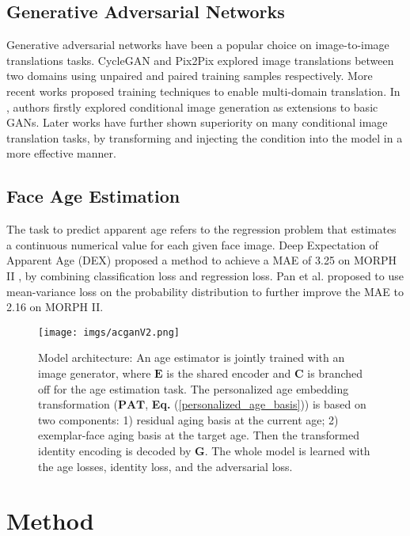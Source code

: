 \documentclass[final]{cvpr}
\begin{document}
\subsection{Generative Adversarial Networks}
Generative adversarial networks \cite{goodfellow2014generative} have been a popular choice on image-to-image translations tasks. CycleGAN \cite{zhu2017unpaired} and Pix2Pix \cite{pix2pix2017} explored image translations between two domains using unpaired and paired training samples respectively. More recent works \cite{choi2018stargan,liu2019stgan} proposed training techniques to enable multi-domain translation. In \cite{mirza2014conditional, odena2017conditional}, authors firstly explored conditional image generation as extensions to basic GANs. Later works \cite{choi2020stargan,park2019gaugan} have further shown superiority on many conditional image translation tasks, by transforming and injecting the condition into the model in a more effective manner.

\subsection{Face Age Estimation}
The task to predict apparent age refers to the regression problem that estimates a continuous numerical value for each given face image. Deep Expectation of Apparent Age (DEX) \cite{rothe2015dex} proposed a method to achieve a MAE of 3.25 on MORPH II \cite{ricanek2006morph}, by combining classification loss and regression loss. Pan et al. \cite{pan2018mean} proposed to use mean-variance loss on the probability distribution to further improve the MAE to 2.16 on MORPH II.


\begin{figure}
\centering
\texttt{[image: imgs/acganV2.png]}
\caption{Model architecture: An age estimator is jointly trained with an image generator, where \(\mathbf{E}\) is the shared encoder and \(\mathbf{C}\) is branched off for the age estimation task. The personalized age embedding transformation ($\mathbf{PAT}$, \textbf{Eq.} (\ref{personalized_age_basis})) is based on two components: 
1) residual aging basis at the current age; 
2) exemplar-face aging basis at the target age. Then the transformed identity encoding is decoded by $\mathbf{G}$. The whole model is learned with the age losses, identity loss, and the adversarial loss.}
\label{method_diag}
\end{figure}
\section{Method}
\end{document}
